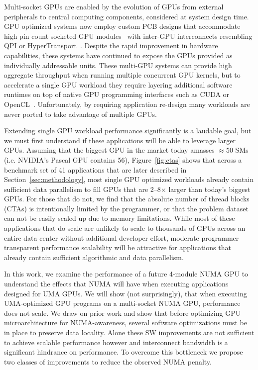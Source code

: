 Multi-socket GPUs are enabled by the evolution of GPUs from external
peripherals to central computing components, considered at system design time.  
GPU optimized systems now employ custom PCB designs that accommodate 
high pin count socketed GPU modules~\cite{dgx} with inter-GPU interconnects resembling 
QPI or HyperTransport~\cite{NVLINK,INTELQPI,AMDHT}. Despite the rapid 
improvement in hardware capabilities, these systems have 
continued to expose the GPUs provided as individually addressable units. These
multi-GPU systems can provide high aggregate throughput when running multiple concurrent
GPU kernels, but to accelerate a single GPU workload they
require layering additional software runtimes on top of native GPU programming 
interfaces such as CUDA or OpenCL~\cite{CUDA,OPENCL}. Unfortunately, by requiring
application re-design many workloads are never ported to take advantage
of multiple GPUs.

Extending single GPU workload performance significantly is a laudable
goal, but we must first understand if these applications will be able to leverage
larger GPUs. Assuming that the biggest GPU in the market today amasses $\approx$50 SMs (i.e. NVIDIA's Pascal GPU contains
56), Figure~\ref{fig:ctas} shows that across a benchmark set of 41 applications that are later described in Section~\ref{sec:methodology},
 most single GPU optimized workloads already
contain sufficient data parallelism to fill GPUs that are 2--8$\times$ larger 
than today's biggest GPUs. For those that do not, we find that the absolute number
of thread blocks (CTAs) is intentionally limited by the programmer, or that the problem dataset can not
be easily scaled up due to memory limitations.
While most of these applications that do scale are unlikely to scale to thousands of GPUs across an 
entire data center without additional developer effort, moderate programmer transparent performance 
scalability will be
attractive for applications that already contain sufficient algorithmic and data parallelism.

In this work, we examine the performance of a future 4-module NUMA GPU to 
understand the effects that NUMA will have when executing applications designed 
for UMA GPUs. We will show (not surprisingly), that when executing UMA-optimized 
GPU programs on a multi-socket NUMA GPU, performance does not scale.  We draw on 
prior work and show that before optimizing GPU microarchitecture for 
NUMA-awareness, several software optimizations must be in place to preserve data 
locality.  Alone these SW improvements are not sufficient to achieve scalable 
performance however and interconnect bandwidth is a significant hindrance on 
performance.  To overcome this bottleneck we propose two classes of improvements 
to reduce the observed NUMA penalty.

